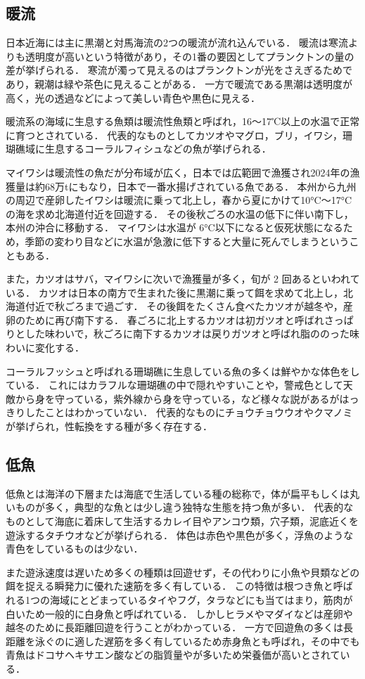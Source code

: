 \documentclass[12pt,a4j,titlepage]{ltjsarticle}
\begin{document}
\subsection{暖流}
日本近海には主に黒潮と対馬海流の2つの暖流が流れ込んでいる．
暖流は寒流よりも透明度が高いという特徴があり，その1番の要因としてプランクトンの量の差が挙げられる．
寒流が濁って見えるのはプランクトンが光をさえぎるためであり，親潮は緑や茶色に見えることがある．
一方で暖流である黒潮は透明度が高く，光の透過などによって美しい青色や黒色に見える．\par
暖流系の海域に生息する魚類は暖流性魚類と呼ばれ，16〜17℃以上の水温で正常に育つとされている．
代表的なものとしてカツオやマグロ，ブリ，イワシ，珊瑚礁域に生息するコーラルフィシュなどの魚が挙げられる．\par
マイワシは暖流性の魚だが分布域が広く，日本では広範囲で漁獲され2024年の漁獲量は約68万tにもなり，日本で一番水揚げされている魚である．
本州から九州の周辺で産卵したイワシは暖流に乗って北上し，春から夏にかけて10°C〜17°Cの海を求め北海道付近を回遊する．
その後秋ごろの水温の低下に伴い南下し，本州の沖合に移動する．
マイワシは水温が 6°C以下になると仮死状態になるため，季節の変わり目などに水温が急激に低下すると大量に死んでしまうということもある．\par
また，カツオはサバ，マイワシに次いで漁獲量が多く，旬が 2 回あるといわれている．
カツオは日本の南方で生まれた後に黒潮に乗って餌を求めて北上し，北海道付近で秋ごろまで過ごす．
その後餌をたくさん食べたカツオが越冬や，産卵のために再び南下する．
春ごろに北上するカツオは初ガツオと呼ばれさっぱりとした味わいで，秋ごろに南下するカツオは戻りガツオと呼ばれ脂ののった味わいに変化する．\par
コーラルフッシュと呼ばれる珊瑚礁に生息している魚の多くは鮮やかな体色をしている\cite{nettaigyo}．
これにはカラフルな珊瑚礁の中で隠れやすいことや，警戒色として天敵から身を守っている，紫外線から身を守っている，など様々な説があるがはっきりしたことはわかっていない．
代表的なものにチョウチョウウオやクマノミが挙げられ，性転換をする種が多く存在する．
\subsection{低魚}
低魚とは海洋の下層または海底で生活している種の総称で，体が扁平もしくは丸いものが多く，典型的な魚とは少し違う独特な生態を持つ魚が多い．
代表的なものとして海底に着床して生活するカレイ目やアンコウ類，穴子類，泥底近くを遊泳するタチウオなどが挙げられる．
体色は赤色や黒色が多く，浮魚のような青色をしているものは少ない．\par
また遊泳速度は遅いため多くの種類は回遊せず，その代わりに小魚や貝類などの餌を捉える瞬発力に優れた速筋を多く有している．
この特徴は根つき魚と呼ばれる1つの海域にとどまっているタイやフグ，タラなどにも当てはまり，筋肉が白いため一般的に白身魚と呼ばれている\cite{iro}．
しかしヒラメやマダイなどは産卵や越冬のために長距離回遊を行うことがわかっている．
一方で回遊魚の多くは長距離を泳ぐのに適した遅筋を多く有しているため赤身魚とも呼ばれ，その中でも青魚はドコサヘキサエン酸などの脂質量やが多いため栄養価が高いとされている．
\end{document}
